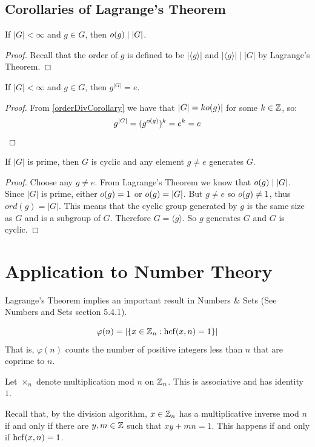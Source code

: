 \documentclass[../main.tex]{subfiles}
\begin{document}
\subsection{Corollaries of Lagrange's Theorem}
\begin{corollary}
  If $|G| < \infty$ and $g \in G$, then $o(g) \mid |G|$.
  \label{orderDivCorollary}
\end{corollary}
\begin{proof}
  Recall that the order of $g$ is defined to be $|\langle g \rangle|$ and $|\langle g \rangle| \mid |G|$ by Lagrange's Theorem.
\end{proof}
\begin{corollary}
  If $|G| < \infty$ and $g \in G$, then $g^{|G|} = e$.
  \label{groupOrderPower}
\end{corollary}
\begin{proof}
  From \cref{orderDivCorollary} we have that $|G| = k o(g)|$ for some $k \in \mathbb{Z}$, so:
  \[
    g^{|G|} = (g^{o(g)})^{k} = e^{k} = e
  \]
\end{proof}
\begin{corollary}
  If $|G|$ is prime, then $G$ is cyclic and any element $g \neq e$ generates $G$.
  \label{primeOrderGroup}
\end{corollary}
\begin{proof}
  Choose any $g \neq e$.
  From Lagrange's Theorem we know that $o(g) \mid |G|$.
  Since $|G|$ is prime, either $o(g) = 1$ or $o(g) = |G|$.
  But $g \neq e$ so $o(g) \neq 1$, thus $ord(g) = |G|$.
  This means that the cyclic group generated by $g$ is the same size as $G$ and is a subgroup of $G$.
  Therefore $G = \langle g \rangle$.
  So $g$ generates $G$ and $G$ is cyclic.
\end{proof}
\section{Application to Number Theory}
Lagrange's Theorem implies an important result in Numbers \& Sets (See Numbers and Sets section 5.4.1).
\begin{definition}
  \[
    \varphi(n) = |\{x \in \mathbb{Z}_n : \operatorname{hcf}(x, n) = 1\}|
  \]
  That is, $\varphi(n)$ counts the number of positive integers less than $n$ that are coprime to $n$.
\end{definition}
\begin{remark}[Notation]
  Let $\times_n$ denote multiplication mod $n$ on $\mathbb{Z}_n$.
  This is associative and has identity $1$.
\end{remark}
Recall that, by the division algorithm, $x \in \mathbb{Z}_n$ has a multiplicative inverse mod $n$ if and only if there are $y, m \in \mathbb{Z}$ such that $xy + mn = 1$.
This happens if and only if $\operatorname{hcf}(x, n) = 1$.
\end{document}
